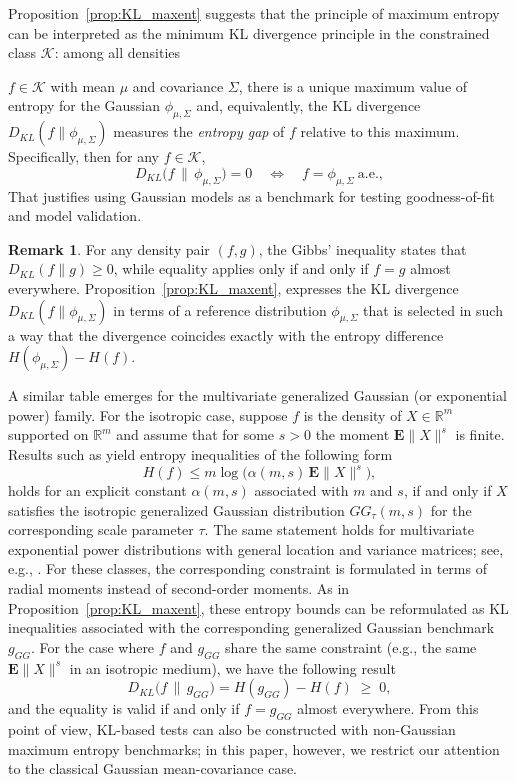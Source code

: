 \documentclass[12pt,a4paper]{article}
\newcommand{\E}{\mathbf {E}}
\theoremstyle{definition}
\newtheorem{remark}[definition]{Remark}
\theoremstyle{plain}
\begin{document}
Proposition~\ref{prop:KL_maxent} suggests that the principle of maximum entropy can be interpreted as the minimum KL divergence principle in the constrained class $\mathcal{K}$: among all densities {$f \in \mathcal{K}$  with mean ${\mu}$ and covariance
${{\Sigma}}$, there is a unique maximum value of entropy for the Gaussian $\phi_{{\mu},{{\Sigma}}}$ and, equivalently, the KL divergence $D_{KL}(f\|\phi_{{\mu},{{\Sigma}}})$ measures the
\emph{entropy gap} of $f$ relative to this maximum. Specifically, then for any $f \in \mathcal{K}$,
\[
D_{KL}\bigl(f \,\|\, \phi_{{\mu},{\Sigma}}\bigr) = 0
\quad\Longleftrightarrow\quad
f = \phi_{{\mu},{\Sigma}} \ \text{a.e.},
\]
That justifies using Gaussian models as a benchmark for testing goodness-of-fit and model validation.

\begin{remark}
For any density pair $(f,g)$, the Gibbs' inequality states that $D_{KL} \left(f\|g\right) \ge 0$,
while equality applies only if and only if $f = g$ almost everywhere. Proposition~\ref{prop:KL_maxent},
expresses the KL divergence $D_{KL}(f\|\phi_{{\mu},{\Sigma}})$ in terms of a reference distribution $\phi_{{\mu},{\Sigma}}$ that is selected in such a way that the divergence coincides exactly with the entropy difference $H(\phi_{{\mu},{\Sigma}})-H(f)$. 

\end{remark}

A similar table emerges for the multivariate generalized Gaussian (or exponential power) family. For the isotropic case, suppose $f$ is the density of ${{X}}\in\mathbb{R}^m$ supported on $\mathbb{R}^m$ and assume that for some $s>0$ the moment $\E\|{{X}}\|^{s}$ is finite. Results such as \cite{kapur1989,solaro2004,berrett2019a} yield entropy inequalities of the following form
\[
H(f) \leq m \log\!\bigl(\alpha(m,s)\,\E\|{{X}}\|^{s}\bigr),
\]
holds for an explicit constant $\alpha(m,s)$ associated with $m$ and $s$, if and only if ${{X}}$ satisfies the isotropic generalized Gaussian distribution $GG_{\tau}(m,s)$ for the corresponding scale parameter $\tau$. The same statement holds for multivariate exponential power distributions with general location and variance matrices; see, e.g., \cite{solaro2004,berrett2019a}. For these classes, the corresponding constraint is formulated in terms of radial moments instead of second-order moments. As in Proposition~\ref{prop:KL_maxent}, these entropy bounds can be reformulated as KL inequalities associated with the corresponding generalized Gaussian benchmark $g_{GG}$. For the case where $f$ and $g_{GG}$ share the same constraint (e.g., the same $\E\|{{X}}\|^{s}$ in an isotropic medium), we have the following result
\[
D_{KL}\bigl(f \,\|\, g_{GG}\bigr)
= H(g_{GG}) - H(f) \;\geq\; 0,
\]
and the equality is valid if and only if $f = g_{GG}$ almost everywhere. From this point of view, KL-based tests can also be constructed with non-Gaussian maximum entropy benchmarks; in this paper, however, we restrict our attention to the classical Gaussian mean-covariance case.

}
\end{document}
